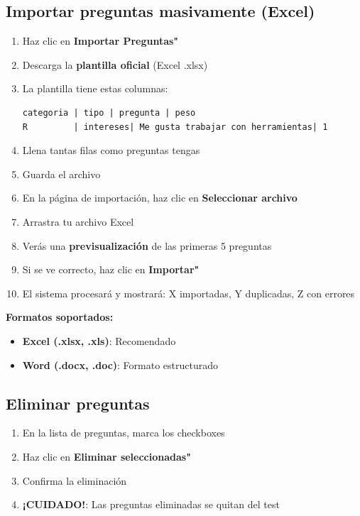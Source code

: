 \documentclass[12pt, a4paper]{report}
\begin{document}
\subsection{Importar preguntas masivamente (Excel)}
\begin{enumerate}
    \item Haz clic en \textbf{Importar Preguntas"}
    \item Descarga la \textbf{plantilla oficial} (Excel .xlsx)
    \item La plantilla tiene estas columnas:
    \begin{lstlisting}[basicstyle=\ttfamily\small]
categoria | tipo | pregunta | peso
R         | intereses| Me gusta trabajar con herramientas| 1
    \end{lstlisting}
    \item Llena tantas filas como preguntas tengas
    \item Guarda el archivo
    \item En la página de importación, haz clic en \textbf{Seleccionar archivo}
    \item Arrastra tu archivo Excel
    \item Verás una \textbf{previsualización} de las primeras 5 preguntas
    \item Si se ve correcto, haz clic en \textbf{Importar"}
    \item El sistema procesará y mostrará: X importadas, Y duplicadas, Z con errores
\end{enumerate}

\textbf{Formatos soportados:}
\begin{itemize}
    \item \textbf{Excel (.xlsx, .xls)}: Recomendado
    \item \textbf{Word (.docx, .doc)}: Formato estructurado
\end{itemize}

\subsection{Eliminar preguntas}
\begin{enumerate}
    \item En la lista de preguntas, marca los checkboxes
    \item Haz clic en \textbf{Eliminar seleccionadas"}
    \item Confirma la eliminación
    \item \textbf{¡CUIDADO!}: Las preguntas eliminadas se quitan del test
\end{enumerate}
\end{document}
